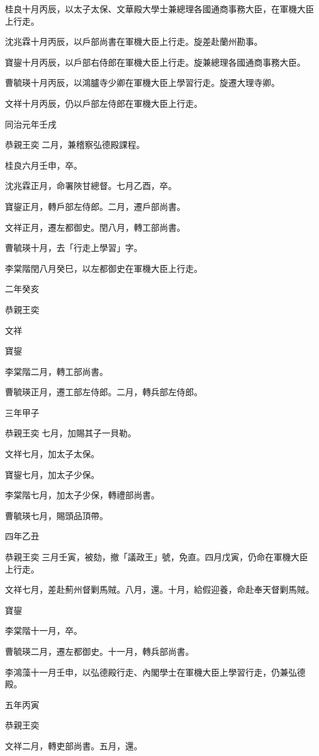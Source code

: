 \begin{pinyinscope}
桂良十月丙辰，以太子太保、文華殿大學士兼總理各國通商事務大臣，在軍機大臣上行走。

沈兆霖十月丙辰，以戶部尚書在軍機大臣上行走。旋差赴蘭州勘事。

寶鋆十月丙辰，以戶部右侍郎在軍機大臣上行走。旋兼總理各國通商事務大臣。

曹毓瑛十月丙辰，以鴻臚寺少卿在軍機大臣上學習行走。旋遷大理寺卿。

文祥十月丙辰，仍以戶部左侍郎在軍機大臣上行走。

同治元年壬戌

恭親王奕二月，兼稽察弘德殿課程。

桂良六月壬申，卒。

沈兆霖正月，命署陜甘總督。七月乙酉，卒。

寶鋆正月，轉戶部左侍郎。二月，遷戶部尚書。

文祥正月，遷左都御史。閏八月，轉工部尚書。

曹毓瑛十月，去「行走上學習」字。

李棠階閏八月癸巳，以左都御史在軍機大臣上行走。

二年癸亥

恭親王奕

文祥

寶鋆

李棠階二月，轉工部尚書。

曹毓瑛正月，遷工部左侍郎。二月，轉兵部左侍郎。

三年甲子

恭親王奕七月，加賜其子一貝勒。

文祥七月，加太子太保。

寶鋆七月，加太子少保。

李棠階七月，加太子少保，轉禮部尚書。

曹毓瑛七月，賜頭品頂帶。

四年乙丑

恭親王奕三月壬寅，被劾，撤「議政王」號，免直。四月戊寅，仍命在軍機大臣上行走。

文祥七月，差赴薊州督剿馬賊。八月，還。十月，給假迎養，命赴奉天督剿馬賊。

寶鋆

李棠階十一月，卒。

曹毓瑛二月，遷左都御史。十一月，轉兵部尚書。

李鴻藻十一月壬申，以弘德殿行走、內閣學士在軍機大臣上學習行走，仍兼弘德殿。

五年丙寅

恭親王奕

文祥二月，轉吏部尚書。五月，還。


\end{pinyinscope}
